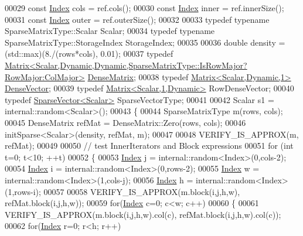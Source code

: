 \begin{DoxyCode}
00029   \textcolor{keyword}{const} \hyperlink{namespace_eigen_a62e77e0933482dafde8fe197d9a2cfde}{Index} cols = ref.cols();
00030   \textcolor{keyword}{const} \hyperlink{namespace_eigen_a62e77e0933482dafde8fe197d9a2cfde}{Index} inner = ref.innerSize();
00031   \textcolor{keyword}{const} \hyperlink{namespace_eigen_a62e77e0933482dafde8fe197d9a2cfde}{Index} outer = ref.outerSize();
00032 
00033   \textcolor{keyword}{typedef} \textcolor{keyword}{typename} SparseMatrixType::Scalar Scalar;
00034   \textcolor{keyword}{typedef} \textcolor{keyword}{typename} SparseMatrixType::StorageIndex StorageIndex;
00035 
00036   \textcolor{keywordtype}{double} density = (std::max)(8./(rows*cols), 0.01);
00037   \textcolor{keyword}{typedef} 
      \hyperlink{group___core___module_class_eigen_1_1_matrix}{Matrix<Scalar,Dynamic,Dynamic,SparseMatrixType::IsRowMajor?RowMajor:ColMajor>}
       \hyperlink{group___core___module}{DenseMatrix};
00038   \textcolor{keyword}{typedef} \hyperlink{group___core___module}{Matrix<Scalar,Dynamic,1>} \hyperlink{group___core___module}{DenseVector};
00039   \textcolor{keyword}{typedef} \hyperlink{group___core___module_class_eigen_1_1_matrix}{Matrix<Scalar,1,Dynamic>} RowDenseVector;
00040   \textcolor{keyword}{typedef} \hyperlink{group___sparse_core___module_class_eigen_1_1_sparse_vector}{SparseVector<Scalar>} SparseVectorType;
00041 
00042   Scalar s1 = internal::random<Scalar>();
00043   \{
00044     SparseMatrixType m(rows, cols);
00045     DenseMatrix refMat = DenseMatrix::Zero(rows, cols);
00046     initSparse<Scalar>(density, refMat, m);
00047 
00048     VERIFY\_IS\_APPROX(m, refMat);
00049 
00050     \textcolor{comment}{// test InnerIterators and Block expressions}
00051     \textcolor{keywordflow}{for} (\textcolor{keywordtype}{int} t=0; t<10; ++t)
00052     \{
00053       \hyperlink{namespace_eigen_a62e77e0933482dafde8fe197d9a2cfde}{Index} j = internal::random<Index>(0,cols-2);
00054       \hyperlink{namespace_eigen_a62e77e0933482dafde8fe197d9a2cfde}{Index} i = internal::random<Index>(0,rows-2);
00055       \hyperlink{namespace_eigen_a62e77e0933482dafde8fe197d9a2cfde}{Index} w = internal::random<Index>(1,cols-j);
00056       \hyperlink{namespace_eigen_a62e77e0933482dafde8fe197d9a2cfde}{Index} h = internal::random<Index>(1,rows-i);
00057 
00058       VERIFY\_IS\_APPROX(m.block(i,j,h,w), refMat.block(i,j,h,w));
00059       \textcolor{keywordflow}{for}(\hyperlink{namespace_eigen_a62e77e0933482dafde8fe197d9a2cfde}{Index} c=0; c<w; c++)
00060       \{
00061         VERIFY\_IS\_APPROX(m.block(i,j,h,w).col(c), refMat.block(i,j,h,w).col(c));
00062         \textcolor{keywordflow}{for}(\hyperlink{namespace_eigen_a62e77e0933482dafde8fe197d9a2cfde}{Index} r=0; r<h; r++)

\end{DoxyCode}
